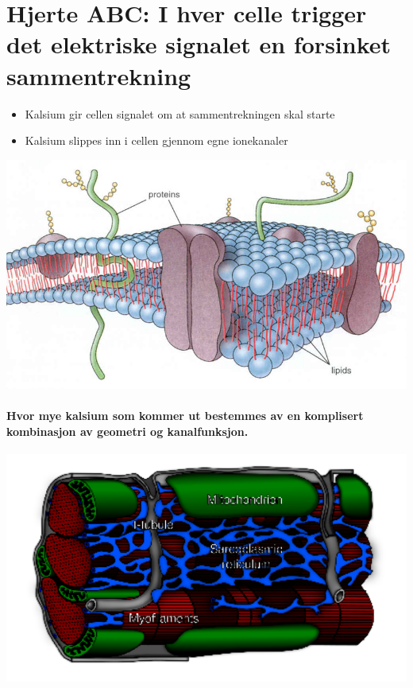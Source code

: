 \documentclass[%
oneside,                 %
final,                   %
10pt]{article}
\begin{document}


\section{Hjerte ABC: I hver celle trigger det elektriske signalet en forsinket sammentrekning}

\begin{itemize}
\item Kalsium gir cellen signalet om at sammentrekningen skal starte

\item Kalsium slippes inn i cellen gjennom egne ionekanaler
\end{itemize}

\noindent



\centerline{\includegraphics[width=0.9\linewidth]{fig/cell_membrane.jpg}}





\paragraph{Hvor mye kalsium som kommer ut bestemmes av en komplisert kombinasjon av geometri og kanalfunksjon.}
\centerline{\includegraphics[width=0.9\linewidth]{fig/sarcomere_nice_black.pdf}}
\end{document}
